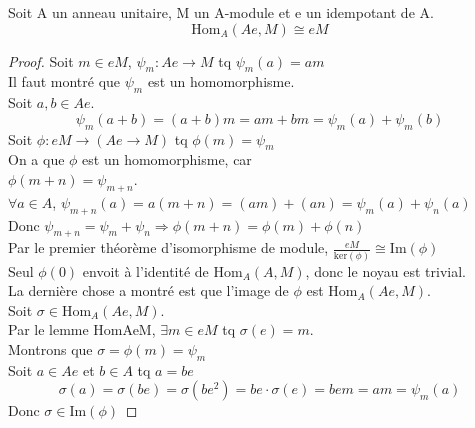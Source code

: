 \begin{lemma}[HomAeMisoeM]
    \label{HomAeMisoeM}
    Soit A un anneau unitaire, M un A-module et e un idempotant de A.
    \[ \text{Hom}_{A}(A e,M) \cong e M\]
\end{lemma}
\begin{proof}
    Soit $m \in e M$, $\psi_{m} : A e \to M$ tq $\psi_{m}(a) = a m$\\
    Il faut montré que $\psi_{m}$ est un homomorphisme.\\
    Soit $a,b \in A e$.\\
    \[ \psi_{m}(a+b) = (a+b)m = a m + b m = \psi_{m}(a) + \psi_{m}(b) \]
    Soit $\phi : e M \to (A e \to M)$ tq $\phi(m) = \psi_{m}$\\
    On a que $\phi$ est un homomorphisme, car\\
    $\phi(m+n) = \psi_{m+n}$.\\
    $\forall a \in A$, $\psi_{m+n}(a) = a (m+n) = (a m) + (a n) = \psi_{m}(a)+\psi_{n}(a)$\\
    Donc $\psi_{m+n} = \psi_{m}+\psi_{n} \Rightarrow \phi(m+n) = \phi(m)+\phi(n)$\\
    Par le premier théorème d'isomorphisme de module, $\frac{e M}{\text{ker}(\phi)} \cong \text{Im}(\phi)$\\
    Seul $\phi(0)$ envoit à l'identité de $\text{Hom}_{A}(A,M)$, donc le noyau est trivial.\\
    La dernière chose a montré est que l'image de $\phi$ est $\text{Hom}_{A}(A e,M)$.\\
    Soit $\sigma \in \text{Hom}_{A}(A e,M)$.\\
    Par le lemme HomAeM, $\exists m \in eM$ tq $\sigma(e) = m$.\\
    Montrons que $\sigma = \phi(m) = \psi_{m}$\\
    Soit $a \in Ae$ et $b \in A$ tq $a= b e$\\
    \[ \sigma(a) = \sigma (b e) = \sigma(b e^{2}) = b e \cdot \sigma(e) = b e m = a m = \psi_{m}(a) \]
    Donc $\sigma \in \text{Im}(\phi)$
\end{proof}